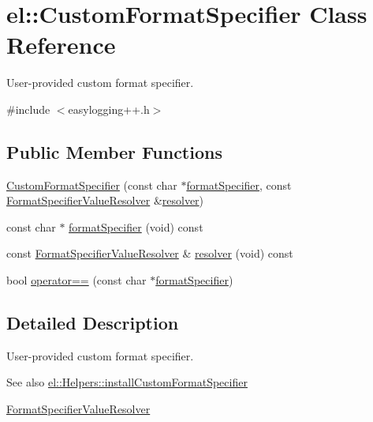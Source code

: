 \hypertarget{classel_1_1_custom_format_specifier}{}\section{el\+:\+:Custom\+Format\+Specifier Class Reference}
\label{classel_1_1_custom_format_specifier}


User-\/provided custom format specifier.  




{\ttfamily \#include $<$easylogging++.\+h$>$}

\subsection*{Public Member Functions}
\begin{DoxyCompactItemize}
\item 
\hyperlink{classel_1_1_custom_format_specifier_a1d1bfa8b489d2908ee543023a51e58f6}{Custom\+Format\+Specifier} (const char $\ast$\hyperlink{classel_1_1_custom_format_specifier_a0be00787b7ca1caedd32e1627d76fd24}{format\+Specifier}, const \hyperlink{namespaceel_ab3cd18425a11df166a041d9024b8b5c6}{Format\+Specifier\+Value\+Resolver} \&\hyperlink{classel_1_1_custom_format_specifier_ac426e6771ae35e060313b8683b88adc8}{resolver})
\item 
const char $\ast$ \hyperlink{classel_1_1_custom_format_specifier_a0be00787b7ca1caedd32e1627d76fd24}{format\+Specifier} (void) const 
\item 
const \hyperlink{namespaceel_ab3cd18425a11df166a041d9024b8b5c6}{Format\+Specifier\+Value\+Resolver} \& \hyperlink{classel_1_1_custom_format_specifier_ac426e6771ae35e060313b8683b88adc8}{resolver} (void) const 
\item 
bool \hyperlink{classel_1_1_custom_format_specifier_ae17a9fbf8c5a28867308fcb8966a3aa0}{operator==} (const char $\ast$\hyperlink{classel_1_1_custom_format_specifier_a0be00787b7ca1caedd32e1627d76fd24}{format\+Specifier})
\end{DoxyCompactItemize}


\subsection{Detailed Description}
User-\/provided custom format specifier. 

\begin{DoxySeeAlso}{See also}
\hyperlink{classel_1_1_helpers_aa6de15a09db4f2a6763a6652c0ea12b1}{el\+::\+Helpers\+::install\+Custom\+Format\+Specifier} 

\hyperlink{namespaceel_ab3cd18425a11df166a041d9024b8b5c6}{Format\+Specifier\+Value\+Resolver} 
\end{DoxySeeAlso}


